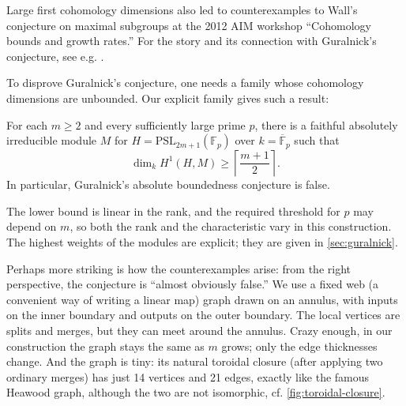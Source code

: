\documentclass[a4paper,11pt]{amsart}
\numberwithin{equation}{subsection}
\theoremstyle{plain}
\theoremstyle{definition}
\theoremstyle{remark}
\begin{document}
\begin{remark}
Large first cohomology dimensions also led to counterexamples
to Wall's conjecture on maximal subgroups at the 2012 AIM
workshop ``Cohomology bounds and growth rates.''
For the story and its connection with
Guralnick's conjecture, see e.g. \cite{BendelEtAlHistory,AIMWall}.
\end{remark}

To disprove Guralnick's conjecture, one needs a family whose
cohomology dimensions are unbounded. Our explicit family gives such a result:

\begin{corollary}\label{cor:intro-guralnick}
For each $m\ge2$ and every sufficiently large prime $p$, there is a
faithful absolutely irreducible module $M$ for
$H=\mathrm{PSL}_{2m+1}(\mathbb F_p)$ over
$k=\overline{\mathbb F}_p$ such that
\[
\dim_k H^1(H,M)\ge\left\lceil\frac{m+1}{2}\right\rceil.
\]
In particular, Guralnick's absolute boundedness conjecture is false.
\end{corollary}

The lower bound is linear in the rank, and the required threshold for $p$ may depend on $m$, so both
the rank and the characteristic vary in this construction.
The highest weights of the modules are explicit; they are
given in \autoref{sec:guralnick}.

Perhaps more striking is how the counterexamples arise: from the right perspective, the conjecture is ``almost obviously false.''
We use a fixed web (a convenient way of writing a linear map) graph drawn on an annulus, with inputs on
the inner boundary and outputs on the outer boundary.
The local vertices are splits and merges,
but they can meet around the annulus.
Crazy enough, in our construction the graph stays the same as $m$ grows; only the edge
thicknesses change. And the graph is tiny: its natural toroidal closure 
(after applying two ordinary merges) has just 14 vertices and 21 edges, exactly like the famous Heawood graph, although the two are not isomorphic, cf. \autoref{fig:toroidal-closure}.
\end{document}
